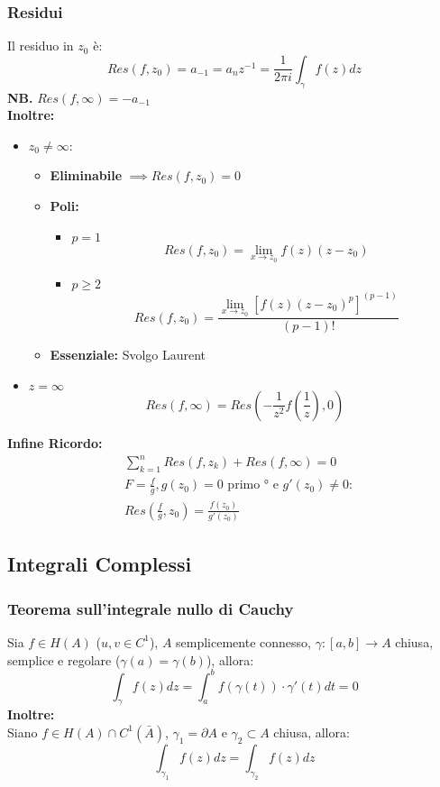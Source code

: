 \documentclass[a4paper,notitlepage]{report}%
\begin{document}
\begin{multicols*}{2}
\subsubsection*{Residui}
Il residuo in $z_0$ è:
\[
    Res(f,z_0) = a_{-1} = a_n z^{-1} = \frac{1}{2\pi i} \int_\gamma f(z) dz
\]
\textbf{NB.} $Res(f,\infty) = -a_{-1}$\\
\textbf{Inoltre:}
\begin{itemize}
    \item $z_0\neq\infty$:
    \begin{itemize}[leftmargin=*]
        \item \textbf{Eliminabile} $\implies Res(f,z_0)=0$
        \item \textbf{Poli:} \begin{itemize}[leftmargin=*]
            \item $p=1$ \[
                Res(f,z_0) = \lim\limits_{x\rightarrow z_0} f(z)(z-z_0)   
            \]
            \item $p\geq 2$ \[
                Res(f,z_0) = \frac{\lim\limits_{x\rightarrow z_0}\left[f(z)(z-z_0)^p\right]^{(p-1)}}{(p-1)!}
            \]
        \end{itemize}
        \item \textbf{Essenziale: } Svolgo Laurent
    \end{itemize}
    \item $z=\infty$\[
        Res(f,\infty) = Res\left(-\frac{1}{z^2}f\left(\frac{1}{z}\right), 0 \right)
    \]
\end{itemize}
\textbf{Infine Ricordo:}
\begin{align*}
    &\sum_{k=1}^n Res(f,z_k)+ Res(f,\infty) = 0 \\
    &F=\frac{f}{g}, g(z_0)=0 \text{ primo ° e } g'(z_0)\neq0 :\\
    &Res\left(\frac{f}{g},z_0\right)=\frac{f(z_0)}{g'(z_0)}
\end{align*}



\subsection*{Integrali Complessi}
\subsubsection{Teorema sull'integrale nullo di Cauchy}
Sia $f\in H(A)$ ($u,v\in C^1$), $A$ semplicemente connesso, $\gamma:[a,b]\to A$ chiusa, semplice e regolare ($\gamma(a)=\gamma(b)$), allora:
\[
    \int_\gamma f(z) dz = \int_a^b f(\gamma(t))\cdot \gamma'(t) dt = 0
\]
\textbf{Inoltre:}\\
Siano $f\in H(A)\cap C^1(\bar{A})$, $\gamma_1 = \partial A$ e $\gamma_2 \subset A $ chiusa, allora:
\[
    \int_{\gamma_1} f(z) dz = \int_{\gamma_2} f(z) dz
\]


\end{multicols*}
\end{document}
